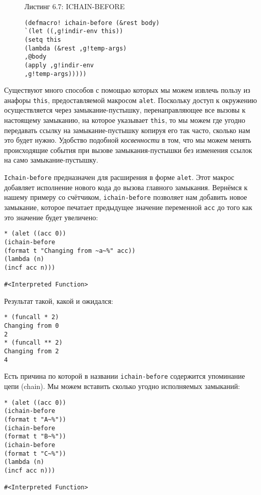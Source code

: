 \begin{figure}Листинг 6.7: ICHAIN-BEFORE\label{listing_6.7}
\listbegin
\begin{verbatim}
(defmacro! ichain-before (&rest body)
`(let ((,g!indir-env this))
(setq this
(lambda (&rest ,g!temp-args)
,@body
(apply ,g!indir-env
,g!temp-args)))))
\end{verbatim}
\listend
\end{figure}

Существуют много способов с помощью которых мы можем извлечь пользу из анафоры \verb"this", предоставляемой макросом \verb"alet". Поскольку доступ к окружению осуществляется через замыкание-пустышку, перенаправляющее все вызовы к настоящему замыканию, на которое указывает \verb"this", то мы можем где угодно передавать ссылку на замыкание-пустышку копируя его так часто, сколько нам это будет нужно. Удобство подобной \emph{косвенности} в том, что мы можем менять происходящие события при вызове замыкания-пустышки без изменения ссылок на само замыкание-пустышку.

\verb"Ichain-before" предназначен для расширения в форме \verb"alet". Этот макрос добавляет исполнение нового кода до вызова главного замыкания. Вернёмся к нашему примеру со счётчиком, \verb"ichain-before" позволяет нам добавить новое замыкание, которое печатает предыдущее значение переменной \verb"acc" до того как это значение будет увеличено:

\begin{verbatim}
* (alet ((acc 0))
(ichain-before
(format t "Changing from ~a~%" acc))
(lambda (n)
(incf acc n)))

#<Interpreted Function>
\end{verbatim}

Результат такой, какой и ожидался:

\begin{verbatim}
* (funcall * 2)
Changing from 0
2
* (funcall ** 2)
Changing from 2
4
\end{verbatim}

Есть причина по которой в названии \verb"ichain-before" содержится упоминание цепи (chain). Мы можем вставить сколько угодно исполняемых замыканий:

\begin{verbatim}
* (alet ((acc 0))
(ichain-before
(format t "A~%"))
(ichain-before
(format t "B~%"))
(ichain-before
(format t "C~%"))
(lambda (n)
(incf acc n)))

#<Interpreted Function>
\end{verbatim}

